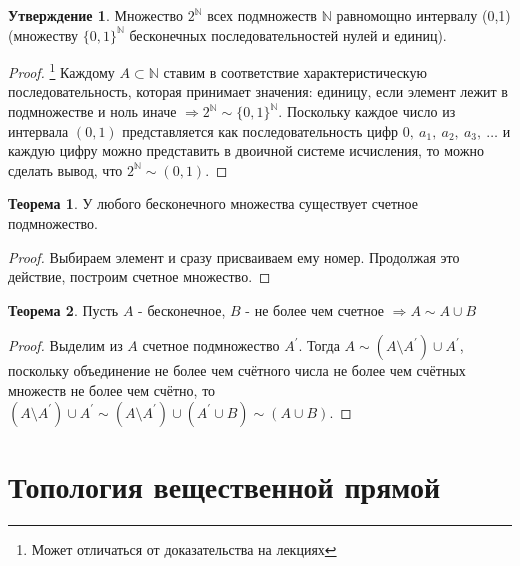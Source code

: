 \documentclass[a4paper, 12pt]{article}
\newcommand{\N}{\mathbb{N}}
\theoremstyle{definition}
\newtheorem*{theorem}{Теорема}
\newtheorem*{statement}{Утверждение}
\begin{document}
        \begin{statement}
            Множество $2^{\N}$ всех подмножеств $\N$ равномощно интервалу (0,1) (множеству $\{0,1\}^{\N}$ бесконечных последовательностей нулей и единиц).
        \end{statement}
        \begin{proof}\footnote{Может отличаться от доказательства на лекциях}
            Каждому $A\subset \N$ ставим в соответствие характеристическую последовательность, которая принимает значения: единицу, если элемент лежит в подмножестве и ноль иначе $\Rightarrow 2^{\N}\sim \{0,1\}^{\N}$. Поскольку каждое число из интервала $(0,1)$ представляется как последовательность цифр $0,\ a_1,\ a_2,\ a_3,\ \dots$ и каждую цифру можно представить в двоичной системе исчисления, то можно сделать вывод, что $2^{\N}\sim (0,1)$.
        \end{proof}
        \begin{theorem}
            У любого бесконечного множества существует счетное подмножество.
        \end{theorem} 
        \begin{proof}
            Выбираем элемент и сразу присваиваем ему номер. Продолжая это действие, построим счетное множество.
        \end{proof}
        \begin{theorem}
            Пусть $A$ - бесконечное, $B$ - не более чем счетное $\Rightarrow A\sim A\cup B$
        \end{theorem} 
        \begin{proof}
            Выделим из $A$ счетное подмножество $A^{\prime}$. Тогда $A\sim (A\setminus A^{\prime})\cup A^{\prime}$, поскольку объединение не более чем счётного числа не более чем счётных множеств не более чем счётно, то  $(A\setminus A^{\prime})\cup A^{\prime} \sim (A\setminus A^{\prime})\cup(A^{\prime}\cup B) \sim(A\cup B)$.
        \end{proof}
    \newpage
    \section{Топология вещественной прямой}
\end{document}
